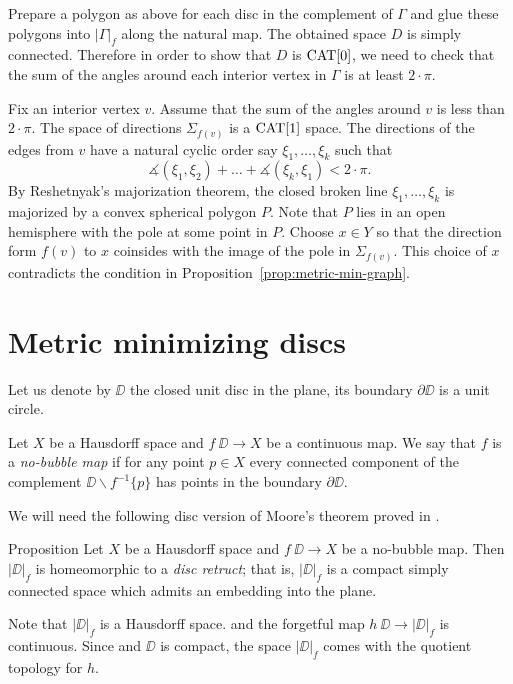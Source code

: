 \documentclass[a4paper,10pt]{amsart}
\begin{document}
Prepare a polygon as above for each disc in the complement of $\Gamma$
and glue these polygons into $|\Gamma|_f$ along the natural map.
The obtained space $D$ is simply connected.
Therefore in order to show that $D$ is $\mathop{\rm CAT}\nolimits[0]$,
we need to check that the sum of the angles around each interior vertex in $\Gamma$ is at least $2\cdot\pi$.

Fix an interior vertex $v$.
Assume that the sum of the angles around $v$ is less than $2\cdot\pi$.
The space of directions $\Sigma_{f(v)}$ is a $\mathop{\rm CAT}\nolimits[1]$ space.
The directions of the edges from $v$ have a natural
cyclic order say $\xi_1,\dots,\xi_k$
such that
\[\measuredangle(\xi_1,\xi_2)+\dots+\measuredangle(\xi_k,\xi_1)<2\cdot\pi.\]
By Reshetnyak's majorization theorem,
the closed broken line $\xi_1,\dots,\xi_k$ is majorized by a convex spherical polygon $P$.
Note that $P$ lies in an open hemisphere with the pole  at some point in $P$.
Choose $x\in Y$ so that the direction form $f(v)$ to $x$ coinsides with the image of the pole in $\Sigma_{f(v)}$.
This choice of $x$ contradicts the condition in Proposition~\ref{prop:metric-min-graph}.\qeds







\section{Metric minimizing discs}



Let us denote by $\DD$ the closed unit disc in the plane,
its boundary $\partial \DD$ is a unit circle.

Let $X$ be a Hausdorff space and
$f\:\DD\to X$ be a continuous map.
We say that $f$ is a \emph{no-bubble map}
if for any point $p\in X$ every connected component of the complement $\DD\backslash f^{-1}\{p\}$ has points in the boundary $\partial \DD$.


We will need the following disc version of Moore's theorem proved in \cite{moore}.

\begin{thm}{Proposition}\label{prop:disc-moore}
Let $X$ be a Hausdorff space and
$f\:\DD\to X$ be a no-bubble map.
Then $|\DD|_f$ is homeomorphic to a \emph{disc retruct};
that is, $|\DD|_f$ is a compact simply connected space which admits an embedding into the plane.
\end{thm}


Note that $|\DD|_f$ is a Hausdorff space.
and the forgetful map $h\:\DD\to |\DD|_f$ is continuous.
Since and $\DD$ is compact, the space $|\DD|_f$ comes with the quotient topology for $h$. 
\end{document}
